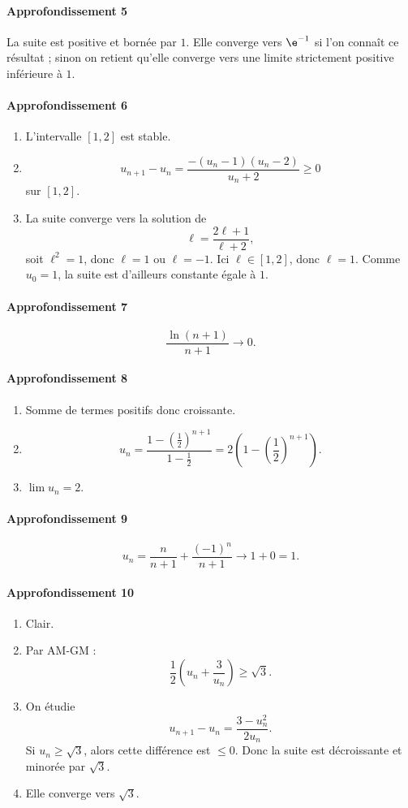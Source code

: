\documentclass[11pt,a4paper]{article}
\theoremstyle{definition}
\begin{document}
\paragraph{Approfondissement 5}
La suite est positive et bornée par $1$. Elle converge vers $\e^{-1}$ si l'on connaît ce résultat ; sinon on retient qu'elle converge vers une limite strictement positive inférieure à $1$.

\paragraph{Approfondissement 6}
\begin{enumerate}[label=\arabic*.]
    \item L'intervalle $[1,2]$ est stable.
    \item
    \[
    u_{n+1}-u_n=\frac{-(u_n-1)(u_n-2)}{u_n+2}\ge0
    \]
    sur $[1,2]$.
    \item La suite converge vers la solution de
    \[
    \ell=\frac{2\ell+1}{\ell+2},
    \]
    soit $\ell^2=1$, donc $\ell=1$ ou $\ell=-1$. Ici $\ell\in[1,2]$, donc $\ell=1$. Comme $u_0=1$, la suite est d'ailleurs constante égale à $1$.
\end{enumerate}

\paragraph{Approfondissement 7}
\[
\frac{\ln(n+1)}{n+1}\to0.
\]

\paragraph{Approfondissement 8}
\begin{enumerate}[label=\arabic*.]
    \item Somme de termes positifs donc croissante.
    \item
    \[
    u_n=\frac{1-\left(\frac12\right)^{n+1}}{1-\frac12}=2\left(1-\left(\frac12\right)^{n+1}\right).
    \]
    \item $\lim u_n=2$.
\end{enumerate}

\paragraph{Approfondissement 9}
\[
u_n=\frac{n}{n+1}+\frac{(-1)^n}{n+1}\to1+0=1.
\]

\paragraph{Approfondissement 10}
\begin{enumerate}[label=\arabic*.]
    \item Clair.
    \item Par AM-GM :
    \[
    \frac12\left(u_n+\frac3{u_n}\right)\ge \sqrt3.
    \]
    \item On étudie
    \[
    u_{n+1}-u_n=\frac{3-u_n^2}{2u_n}.
    \]
    Si $u_n\ge \sqrt3$, alors cette différence est $\le0$. Donc la suite est décroissante et minorée par $\sqrt3$.
    \item Elle converge vers $\sqrt3$.
\end{enumerate}
\end{document}
